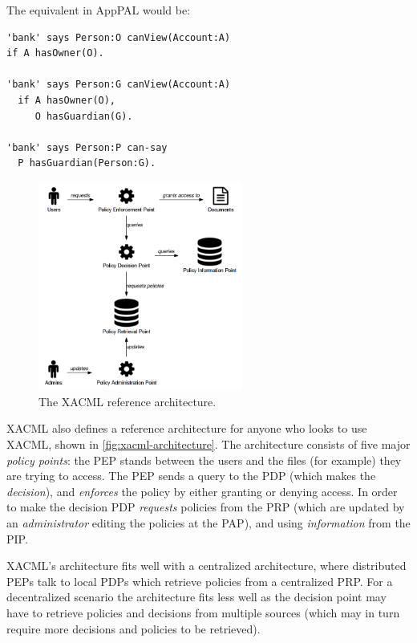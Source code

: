 \documentclass[thesis.tex]{subfiles}
\begin{document}
The equivalent in AppPAL would be:

\begin{lstlisting}
'bank' says Person:O canView(Account:A)
if A hasOwner(O).

'bank' says Person:G canView(Account:A)
  if A hasOwner(O),
     O hasGuardian(G).

'bank' says Person:P can-say
  P hasGuardian(Person:G).
\end{lstlisting}

\begin{figure}
  \centering
  \includegraphics[width=0.6\textwidth]{figures/xacml-architecture.png}
  \caption{The XACML reference architecture.}
  \label{fig:xacml-architecture}
\end{figure}

XACML also defines a reference architecture for anyone who looks to use XACML,
shown in \autoref{fig:xacml-architecture}. The architecture consists of five
major \emph{policy points}: the PEP stands between the users and the files (for
example) they are trying to access. The PEP sends a query to the PDP (which
makes the \emph{decision}), and \emph{enforces} the policy by either granting or
denying access. In order to make the decision PDP \emph{requests} policies from
the PRP (which are updated by an \emph{administrator} editing the policies at
the PAP), and using \emph{information} from the PIP. 

XACML's architecture fits well with a centralized architecture, where
distributed PEPs talk to local PDPs which retrieve policies from a centralized
PRP. For a decentralized scenario the architecture fits less well as the
decision point may have to retrieve policies and decisions from multiple sources
(which may in turn require more decisions and policies to be retrieved).
\end{document}
